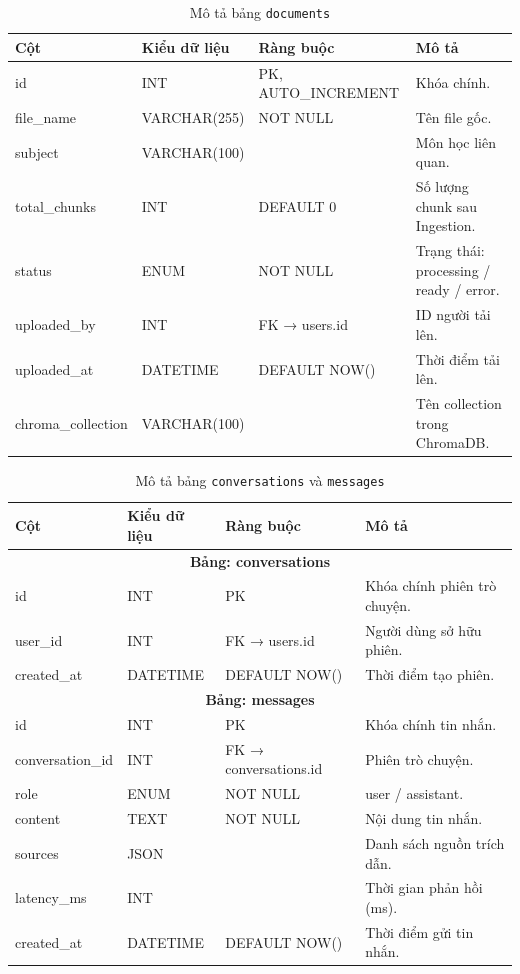 \begin{table}[H]
  \centering
  \caption{Mô tả bảng \texttt{documents}}
  \label{tab:db-documents}
  \renewcommand{\arraystretch}{1.4}
  \begin{tabularx}{\textwidth}{|l|l|l|X|}
    \hline
    \rowcolor{blue!10}
    \textbf{Cột} & \textbf{Kiểu dữ liệu} & \textbf{Ràng buộc} & \textbf{Mô tả} \\
    \hline
    id & INT & PK, AUTO\_INCREMENT & Khóa chính. \\
    file\_name & VARCHAR(255) & NOT NULL & Tên file gốc. \\
    subject & VARCHAR(100) & & Môn học liên quan. \\
    total\_chunks & INT & DEFAULT 0 & Số lượng chunk sau Ingestion. \\
    status & ENUM & NOT NULL & Trạng thái: processing / ready / error. \\
    uploaded\_by & INT & FK → users.id & ID người tải lên. \\
    uploaded\_at & DATETIME & DEFAULT NOW() & Thời điểm tải lên. \\
    chroma\_collection & VARCHAR(100) & & Tên collection trong ChromaDB. \\
    \hline
  \end{tabularx}
\end{table}

\begin{table}[H]
  \centering
  \caption{Mô tả bảng \texttt{conversations} và \texttt{messages}}
  \label{tab:db-chat}
  \renewcommand{\arraystretch}{1.4}
  \begin{tabularx}{\textwidth}{|l|l|l|X|}
    \hline
    \rowcolor{blue!10}
    \textbf{Cột} & \textbf{Kiểu dữ liệu} & \textbf{Ràng buộc} & \textbf{Mô tả} \\
    \hline
    \multicolumn{4}{|c|}{\cellcolor{gray!20} \textbf{Bảng: conversations}} \\
    \hline
    id & INT & PK & Khóa chính phiên trò chuyện. \\
    user\_id & INT & FK → users.id & Người dùng sở hữu phiên. \\
    created\_at & DATETIME & DEFAULT NOW() & Thời điểm tạo phiên. \\
    \hline
    \multicolumn{4}{|c|}{\cellcolor{gray!20} \textbf{Bảng: messages}} \\
    \hline
    id & INT & PK & Khóa chính tin nhắn. \\
    conversation\_id & INT & FK → conversations.id & Phiên trò chuyện. \\
    role & ENUM & NOT NULL & user / assistant. \\
    content & TEXT & NOT NULL & Nội dung tin nhắn. \\
    sources & JSON & & Danh sách nguồn trích dẫn. \\
    latency\_ms & INT & & Thời gian phản hồi (ms). \\
    created\_at & DATETIME & DEFAULT NOW() & Thời điểm gửi tin nhắn. \\
    \hline
  \end{tabularx}
\end{table}

